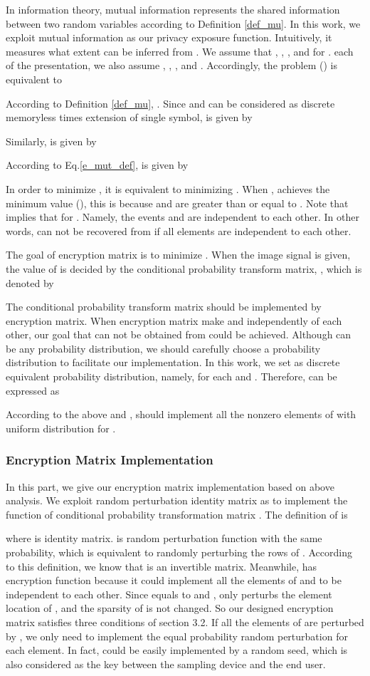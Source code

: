 \documentclass[conference]{IEEEtran}
\begin{document}
In information theory, mutual information represents the shared information between two random variables according to Definition \ref{def_mu}. In this work, we exploit mutual information as our privacy exposure function. Intuitively, it measures what extent  can be inferred from . We assume that  ,   ,   , and   for . each of the presentation, we also assume  ,  , ,  and . Accordingly, the problem () is equivalent to

According to Definition \ref{def_mu}, . Since  and  can be considered as discrete memoryless  times extension of single symbol,  is given by

Similarly,  is given by
{\small
}

According to Eq.\ref{e_mut_def},  is given by

In order to minimize , it is equivalent to minimizing . When ,  achieves the minimum value (), this is because  and  are greater than or equal to . Note that  implies that   for .  Namely, the events  and  are independent to each other. In other words,  can not be recovered from  if all elements  are independent to each other.

The goal of encryption matrix is to minimize . When the image signal is given, the value of  is decided by the conditional probability transform matrix, , which is denoted by

The conditional probability transform matrix should be implemented by encryption matrix. When encryption matrix make
 and  independently of each other, our goal that  can not be obtained from  could be achieved.
Although  can be any probability distribution, we should carefully choose a probability distribution to facilitate our implementation.
In this work, we set  as discrete equivalent probability distribution, namely,  for each  and . Therefore,  can be expressed as

According to the above  and ,  should implement all the nonzero elements of  with uniform distribution for .

\subsubsection{ Encryption Matrix Implementation}
In this part, we give our encryption matrix  implementation based on above analysis.
We exploit random perturbation  identity matrix as  to implement the function of conditional probability transformation matrix . The definition of  is

where  is identity matrix.  is random perturbation function with the same probability, which is equivalent to randomly perturbing the rows of . According to this definition, we know that  is an invertible matrix. Meanwhile,  has encryption function because it could implement  all the elements of  and   to be independent to each other. Since  equals to  and ,  only perturbs the element location of , and the sparsity of  is not changed. So our designed encryption matrix satisfies three conditions of section 3.2.
If all the elements of  are perturbed by , we only need to implement the equal probability random perturbation for each element. In fact,  could be easily implemented by a random seed, which is also considered as the key between the sampling device and the end user.
\end{document}
